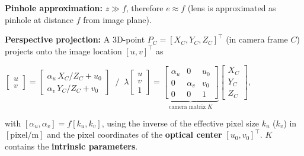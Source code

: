 \documentclass[landscape]{article}
\newcommand{\vmspace}{\vspace{-7pt}}
\newcommand{\vpspace}{\vspace{5pt}}
\begin{document}
\begin{multicols}{3}
\vpspace

\begin{minipage}{\columnwidth}
  \textbf{Pinhole approximation:} $z \gg f$, therefore $e \approx f$ (lens is
  approximated as pinhole at distance $f$ from image plane).
\end{minipage}

\vpspace

\begin{minipage}{\columnwidth}
  \textbf{Perspective projection:} A 3D-point $P_C=[X_C,Y_C,Z_C]^\intercal$ (in
  camera frame $C$) projects
  onto the image location $[u,v]^\intercal$ as
  \vmspace
  \begin{center}
    $\left[\begin{matrix}
      u \\
      v
    \end{matrix}\right]
    =
    \left[\begin{matrix}
      \alpha_u\,X_C/Z_C + u_0 \\
      \alpha_v\,Y_C/Z_C + v_0
    \end{matrix}\right]\;\;/\;\;
    \lambda
    \left[\begin{matrix}
      u \\
      v \\
      1
    \end{matrix}\right]
    =
    \underbrace{\left[\begin{matrix}
      \alpha_u & 0   & u_0 \\
      0   & \alpha_v & v_0 \\
      0   & 0   & 1
    \end{matrix}\right]}_{\text{camera matrix}\; K}
    \left[\begin{matrix}
      X_C \\
      Y_C \\
      Z_C
    \end{matrix}\right],
    $
  \end{center}
  \vmspace with $[\alpha_u, \alpha_v] = f [k_u,k_v]$, using the inverse of the
  effective pixel size $k_u$ ($k_v$) in $[\mathrm{pixel}/\mathrm{m}]$ and the
  pixel coordinates of the \textbf{optical center} $[u_0,v_0]^\intercal$. $K$
  contains the \textbf{intrinsic parameters}.
\end{minipage}

\vpspace


\end{multicols}
\end{document}
